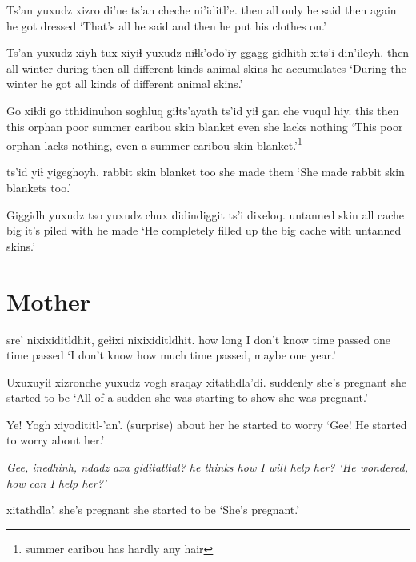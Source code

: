 \documentclass[12pt]{article}
\begin{document}
\gll Ts'an yuxudz xizro di'ne   ts'an cheche ni'iditl'e.
then  all    only    {he said} then again  {he got dressed }
\glt `That's all he said and then he put his clothes on.'
\glend

\gll Ts'an yuxudz xiyh   tux    xiyiɬ yuxudz niɬk'odo'iy     ggagg  gidhith {xits'i din'ileyh.}
then  all    winter during then  all    {different kinds} animal skins          {he accumulates}
\glt `During the winter he got all kinds of different animal skins.'
\glend

\gll Go xiɬdi go   tthidinuhon soghluq giɬts'ayath         ts'id   yiɬ {gan che vuqul hiy}.
this  then this orphan poor       {summer caribou skin} blanket even {she lacks nothing}
\glt `This poor orphan lacks nothing, even a summer caribou skin blanket.'\footnote{summer caribou has hardly any hair}
\glend

 ts'id  yiɬ yigeghoyh.
{rabbit skin} blanket too {she made them}
\glt `She made rabbit skin blankets too.'
\glend

\gll Giggidh        yuxudz tso   yuxudz chux didindiggit          ts'i dixeloq.
{untanned skin}  all    cache   {}     big  {it's piled with} {}      {he made}
\glt `He completely filled up the big cache with untanned skins.'
\glend

\section*{Mother}

 sre'         nixixiditldhit, geɬixi nixixiditldhit.
{how long}  {I don't know} {time passed}   one   {time passed}
\glt `I don't know how much time passed, maybe one year.'
\glend

\gll Uxuxuyiɬ xizronche yuxudz {vogh sraqay} xitathdla'di.
suddenly  {}       {}     {she's pregnant} {she started to be}
\glt `All of a sudden she was starting to show she was pregnant.'
\glend

\gll Ye! Yogh      xiyodititl-'an'.
(surprise)   {about her} {he started to worry}
\glt `Gee! He started to worry about her.'
\glend

\gll \em Gee, \em  inedhinh, {ndadz axa} giditatltal?
{}   {he thinks} how       {I will help her?}
\glt `He wondered, how can I help her?'
\glend

 xitathdla'.
{she's pregnant} {she started to be}
\glt `She's pregnant.' 
\glend
\end{document}
